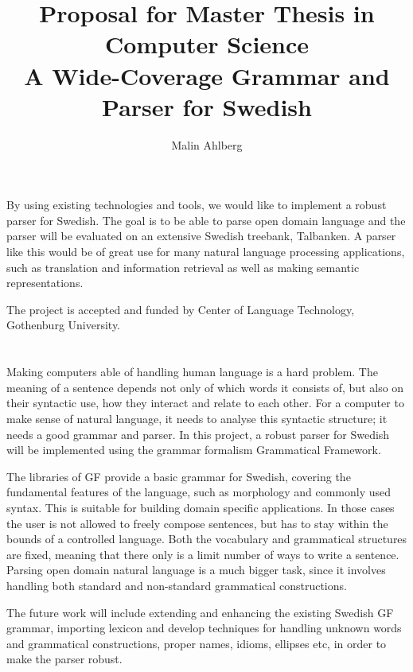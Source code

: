 \documentclass{article}
\begin{document}
\title{Proposal for Master Thesis in Computer Science \\
\vspace{2mm}
 \large{A Wide-Coverage Grammar and Parser for Swedish}}
\author{Malin Ahlberg}
\maketitle
\vspace{20mm}

\thispagestyle{empty}
\abstract
By using existing technologies
and tools, we would like to implement a robust parser for Swedish.
The goal is to be able to parse open domain language and the
parser will be evaluated on an extensive Swedish
treebank, Talbanken. 
A parser like this would be of great use for many natural
language processing applications, such as translation and information retrieval
as well as making semantic representations.

The project is accepted and funded by Center of Language 
Technology, Gothenburg University.


\section*{}
Making computers able of handling human language is a 
hard problem.
The meaning of a sentence depends not only of which words it consists of, but
also on their syntactic use, how they interact and relate to each other.
For a computer to make sense of natural language, it needs to analyse this 
syntactic structure; it needs a good grammar and parser.
In this project, a robust parser for Swedish will be implemented
using the grammar formalism Grammatical Framework. %

The libraries of GF provide a basic grammar for
Swedish, covering the fundamental features of the language, such as morphology and
commonly used syntax. This is suitable 
for building domain specific applications. In those cases the user is not
allowed to freely compose sentences, but has to stay within the bounds of a 
controlled language. Both the vocabulary and grammatical structures are fixed,
meaning that there only is a limit number of ways to write a sentence.
Parsing open domain natural language is a much bigger task, since it involves handling both
standard and non-standard grammatical constructions. 

The future work will include extending and enhancing the existing Swedish GF grammar,
importing lexicon and develop techniques for handling unknown words and grammatical
constructions, proper names, idioms, ellipses etc, in order to make the parser robust.
\end{document}
